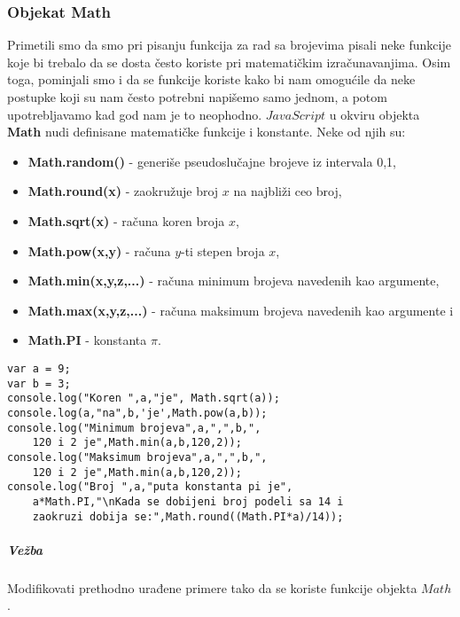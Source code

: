 \subsubsection{Objekat Math}
Primetili smo da smo pri pisanju funkcija za rad sa brojevima pisali neke funkcije koje bi trebalo da se dosta često koriste pri matematičkim izračunavanjima. Osim toga, pominjali smo i da se funkcije koriste kako bi nam omogućile da neke postupke koji su nam često potrebni napišemo samo jednom, a potom upotrebljavamo kad god nam je to neophodno. $JavaScript$ u okviru objekta \textbf{Math} nudi definisane matematičke funkcije i konstante. Neke od njih su:
\begin{itemize}
	\item \textbf{Math.random()} - generiše pseudoslučajne brojeve iz intervala 0,1, 
	\item \textbf{Math.round(x)} - zaokružuje broj $x$ na najbliži ceo broj,  
	\item \textbf{Math.sqrt(x)} - računa koren broja $x$, 
	\item \textbf{Math.pow(x,y)} - računa $y$-ti stepen broja $x$,  
	\item \textbf{Math.min(x,y,z,...)} - računa minimum brojeva navedenih kao argumente,
	\item \textbf{Math.max(x,y,z,...)} - računa maksimum brojeva navedenih kao argumente i
	\item \textbf{Math.PI} - konstanta $\pi$.
\end{itemize} 
\begin{lstlisting}[backgroundcolor = \color{lightgray}, breaklines=true]
var a = 9;
var b = 3;
console.log("Koren ",a,"je", Math.sqrt(a));
console.log(a,"na",b,'je',Math.pow(a,b));
console.log("Minimum brojeva",a,",",b,", 
	120 i 2 je",Math.min(a,b,120,2));
console.log("Maksimum brojeva",a,",",b,",
	120 i 2 je",Math.min(a,b,120,2));
console.log("Broj ",a,"puta konstanta pi je", 
	a*Math.PI,"\nKada se dobijeni broj podeli sa 14 i 
	zaokruzi dobija se:",Math.round((Math.PI*a)/14));
\end{lstlisting}


\subparagraph{Vežba}
Modifikovati prethodno urađene primere tako da se koriste funkcije objekta $Math$.
\newpage
